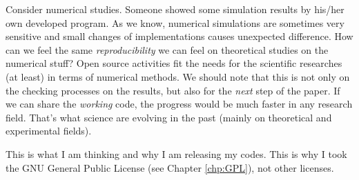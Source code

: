 \documentclass{book}
\begin{document}
Consider numerical studies.
Someone showed some simulation results by his/her own
developed program. As we know, numerical simulations
are sometimes very sensitive and small changes of 
implementations causes unexpected difference.
How can we feel the same {\it reproducibility}
we can feel on theoretical studies on the numerical stuff?
%
Open source activities fit the needs for the scientific
researches (at least) in terms of numerical methods.
%
We should note that this is not only on the checking processes
on the results, but also for the {\it next} step of the paper.
If we can share the {\it working} code, the progress would
be much faster in any research field. That's what science 
are evolving in the past (mainly on theoretical and 
experimental fields).


This is what I am thinking and why I am releasing my codes.
This is why I took the GNU General Public License
(see Chapter \ref{chp:GPL}), not other licenses.


\newpage

\appendix
\end{document}
